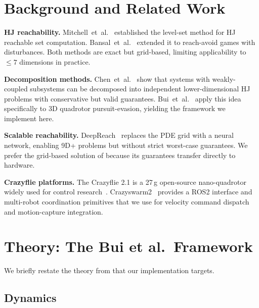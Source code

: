 \documentclass[conference]{IEEEtran}
\begin{document}
\section{Background and Related Work}
\label{sec:related}

\textbf{HJ reachability.}
Mitchell~et~al.~\cite{mitchell2005time} established the level-set method for HJ reachable set computation. Bansal~et~al.~\cite{bansal2017hamilton} extended it to reach-avoid games with disturbances. Both methods are exact but grid-based, limiting applicability to $\leq 7$ dimensions in practice.

\textbf{Decomposition methods.}
Chen~et~al.~\cite{chen2017decomposition} show that systems with weakly-coupled subsystems can be decomposed into independent lower-dimensional HJ problems with conservative but valid guarantees. Bui~et~al.~\cite{bui2025reach} apply this idea specifically to 3D quadrotor pursuit-evasion, yielding the framework we implement here.

\textbf{Scalable reachability.}
DeepReach~\cite{bansal2021deepreach} replaces the PDE grid with a neural network, enabling 9D+ problems but without strict worst-case guarantees. We prefer the grid-based solution of \cite{bui2025reach} because its guarantees transfer directly to hardware.

\textbf{Crazyflie platforms.}
The Crazyflie 2.1 is a 27\,g open-source nano-quadrotor widely used for control research~\cite{preiss2017crazyswarm}. Crazyswarm2~\cite{crazyswarm2} provides a ROS2 interface and multi-robot coordination primitives that we use for velocity command dispatch and motion-capture integration.

\section{Theory: The Bui et al.\ Framework}
\label{sec:theory}

We briefly restate the theory from \cite{bui2025reach} that our implementation targets.

\subsection{Dynamics}
\end{document}
